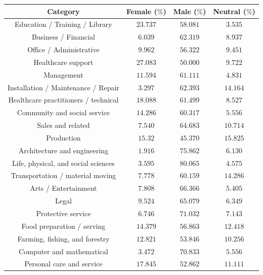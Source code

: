 \documentclass[fleqn,10pt]{article}
\begin{document}
\begin{table}[H]
\centering
\small{
	\begin{tabular}{|c|c|c|c|}
	\hline
	Category 								& Female ($\%$)	& Male ($\%$)	& Neutral ($\%$) \\ \hline
	\hline		
	Education / Training / Library 			& $23.737$ 		& $58.081$		& $3.535$		\\ \hline
	Business / Financial 					& $6.039$		& $62.319$		& $8.937$		\\ \hline
	Office / Administrative					& $9.962$		& $56.322$		& $9.451$		\\ \hline
	Healthcare support						& $27.083$		& $50.000$		& $9.722$		\\ \hline
	Management								& $11.594$		& $61.111$		& $4.831$		\\ \hline
	Installation / Maintenance / Repair		& $3.297$		& $62.393$		& $14.164$		\\ \hline
	Healthcare practitioners / technical	& $18.088$		& $61.499$		& $8.527$		\\ \hline
	Community and social service			& $14.286$ 		& $60.317$		& $5.556$		\\ \hline
	Sales and related						& $7.540$		& $64.683$		& $10.714$		\\ \hline
	Production								& $15.32$		& $45.370$		& $15.825$		\\ \hline
	Architecture and engineering			& $1.916$		& $75.862$		& $6.130$		\\ \hline
	Life, physical, and social sciences		& $3.595$		& $80.065$		& $4.575$		\\ \hline
	Transportation / material moving		& $7.778$		& $60.159$		& $14.286$		\\ \hline
	Arts / Entertainment					& $7.808$		& $66.366$		& $5.405$		\\ \hline
	Legal									& $9.524$ 		& $65.079$		& $6.349$		\\ \hline
	Protective service						& $6.746$		& $71.032$		& $7.143$		\\ \hline
	Food preparation / serving			& $14.379$ 		& $56.863$		& $12.418$		\\ \hline
	Farming, fishing, and forestry			& $12.821$ 		& $53.846$		& $10.256$		\\ \hline
	Computer and mathematical				& $3.472$		& $70.833$		& $5.556$		\\ \hline
	Personal care and service				& $17.845$ 		& $52.862$		& $11.111$		\\ \hline

\end{tabular}}
\end{table}
\end{document}
